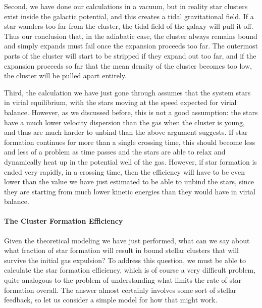 Second, we have done our calculations in a vacuum, but in reality star clusters exist inside the galactic potential, and this creates a tidal gravitational field. If a star wanders too far from the cluster, the tidal field of the galaxy will pull it off. Thus our conclusion that, in the adiabatic case, the cluster always remains bound and simply expands must fail once the expansion proceeds too far. The outermost parts of the cluster will start to be stripped if they expand out too far, and if the expansion proceeds so far that the mean density of the cluster becomes too low, the cluster will be pulled apart entirely.

Third, the calculation we have just gone through assumes that the system stars in virial equilibrium, with the stars moving at the speed expected for virial balance. However, as we discussed before, this is not a good assumption: the stars have a much lower velocity dispersion than the gas when the cluster is young, and thus are much harder to unbind than the above argument suggests. If star formation continues for more than a single crossing time, this should become less and less of a problem as time passes and the stars are able to relax and dynamically heat up in the potential well of the gas. However, if star formation is ended very rapidly, in a crossing time, then the efficiency will have to be even lower than the value we have just estimated to be able to unbind the stars, since they are starting from much lower kinetic energies than they would have in virial balance.

\paragraph{The Cluster Formation Efficiency}

Given the theoretical modeling we have just performed, what can we say about what fraction of star formation will result in bound stellar clusters that will survive the initial gas expulsion? To address this question, we must be able to calculate the star formation efficiency, which is of course a very difficult problem, quite analogous to the problem of understanding what limits the rate of star formation overall. The answer almost certainly involves some sort of stellar feedback, so let us consider a simple model for how that might work.

